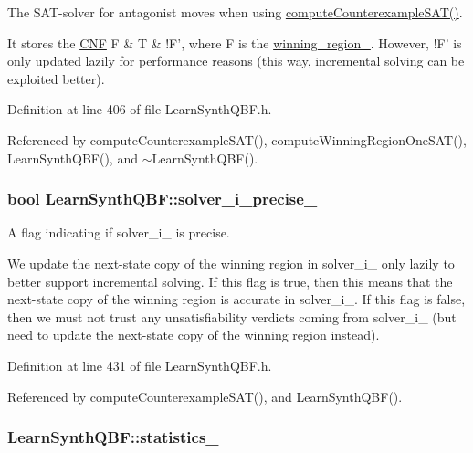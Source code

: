 The S\-A\-T-\/solver for antagonist moves when using \hyperlink{classLearnSynthQBF_a3221800bf3f040b66b8a790bab4c82b5}{compute\-Counterexample\-S\-A\-T()}. 

It stores the \hyperlink{classCNF}{C\-N\-F} F \& T \& !\-F', where F is the \hyperlink{classLearnSynthQBF_a9c6b41f7df5f4ed4bfc5930136fc1152}{winning\-\_\-region\-\_\-}. However, !\-F' is only updated lazily for performance reasons (this way, incremental solving can be exploited better). 

Definition at line 406 of file Learn\-Synth\-Q\-B\-F.\-h.



Referenced by compute\-Counterexample\-S\-A\-T(), compute\-Winning\-Region\-One\-S\-A\-T(), Learn\-Synth\-Q\-B\-F(), and $\sim$\-Learn\-Synth\-Q\-B\-F().

\hypertarget{classLearnSynthQBF_ae65774a2b9e6137d6ff45cbf755d4843}{
\subsubsection[{solver\-\_\-i\-\_\-precise\-\_\-}]{\setlength{\rightskip}{0pt plus 5cm}bool Learn\-Synth\-Q\-B\-F\-::solver\-\_\-i\-\_\-precise\-\_\-\hspace{0.3cm}{\ttfamily [protected]}}}\label{classLearnSynthQBF_ae65774a2b9e6137d6ff45cbf755d4843}


A flag indicating if solver\-\_\-i\-\_\- is precise. 

We update the next-\/state copy of the winning region in solver\-\_\-i\-\_\- only lazily to better support incremental solving. If this flag is true, then this means that the next-\/state copy of the winning region is accurate in solver\-\_\-i\-\_\-. If this flag is false, then we must not trust any unsatisfiability verdicts coming from solver\-\_\-i\-\_\- (but need to update the next-\/state copy of the winning region instead). 

Definition at line 431 of file Learn\-Synth\-Q\-B\-F.\-h.



Referenced by compute\-Counterexample\-S\-A\-T(), and Learn\-Synth\-Q\-B\-F().

\hypertarget{classLearnSynthQBF_a85c46943042fdcfd672ce2251ef49cd9}{
\subsubsection[{statistics\-\_\-}]{ Learn\-Synth\-Q\-B\-F\-::statistics\-\_\-\hspace{0.3cm}{\ttfamily [protected]}}}\label{classLearnSynthQBF_a85c46943042fdcfd672ce2251ef49cd9}


